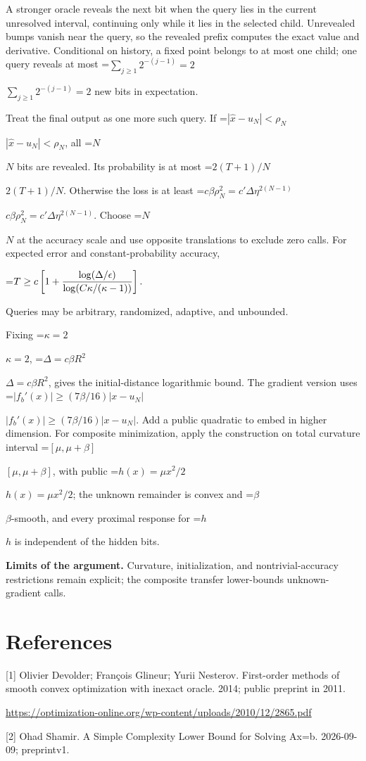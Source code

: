 \documentclass[10pt,a4paper]{article}
\newcommand{\AtlasMath}[1]{\par\begingroup\centering\setbox0=\hbox{$\displaystyle #1$}\ifdim\wd0>1.4\linewidth\typeout{ATLAS WIDE FORMULA: \the\wd0}\fi\ifdim\wd0>\linewidth\resizebox{\linewidth}{!}{\box0}\else\box0\fi\par\endgroup}
\newcommand{\AtlasInlineMath}[1]{\begingroup\setbox0=\hbox{$#1$}\ifdim\wd0>.4\linewidth\endgroup\AtlasMath{#1}\else\endgroup$#1$\fi}
\begin{document}
A stronger oracle reveals the next bit when the query lies in the current unresolved interval, continuing only while it lies in the selected child. Unrevealed bumps vanish near the query, so the revealed prefix computes the exact value and derivative. Conditional on history, a fixed point belongs to at most one child; one query reveals at most \AtlasInlineMath{\sum_{j\ge1}2^{-(j-1)}=2} new bits in expectation.

Treat the final output as one more such query. If \AtlasInlineMath{|\widehat x-u_N|<\rho_N}, all \AtlasInlineMath{N} bits are revealed. Its probability is at most \AtlasInlineMath{2(T+1)/N}. Otherwise the loss is at least
\AtlasInlineMath{c\beta\rho_N^2=c'\Delta\eta^{2(N-1)}}.
Choose \AtlasInlineMath{N} at the accuracy scale and use opposite translations to exclude zero calls. For expected error and constant-probability accuracy,

\AtlasMath{T\ge c\left[1+{\log(\Delta/\epsilon)\over
\log(C\kappa/(\kappa-1))}\right].}

Queries may be arbitrary, randomized, adaptive, and unbounded.

Fixing \AtlasInlineMath{\kappa=2}, \AtlasInlineMath{\Delta=c\beta R^2}, gives the initial-distance logarithmic bound. The gradient version uses
\AtlasInlineMath{|f_b'(x)|\ge(7\beta/16)|x-u_N|}.
Add a public quadratic to embed in higher dimension. For composite minimization, apply the construction on total curvature interval \AtlasInlineMath{[\mu,\mu+\beta]}, with public \AtlasInlineMath{h(x)=\mu x^2/2}; the unknown remainder is convex and \AtlasInlineMath{\beta}-smooth, and every proximal response for \AtlasInlineMath{h} is independent of the hidden bits.

\textbf{Limits of the argument.} Curvature, initialization, and nontrivial-accuracy restrictions remain explicit; the composite transfer lower-bounds unknown-gradient calls.

\section{References}
[1] Olivier Devolder; François Glineur; Yurii Nesterov. First-order methods of smooth convex optimization with inexact oracle. 2014; public preprint in 2011.

\url{https://optimization-online.org/wp-content/uploads/2010/12/2865.pdf}

[2] Ohad Shamir. A Simple Complexity Lower Bound for Solving Ax=b. 2026-09-09; preprintv1.
\end{document}

